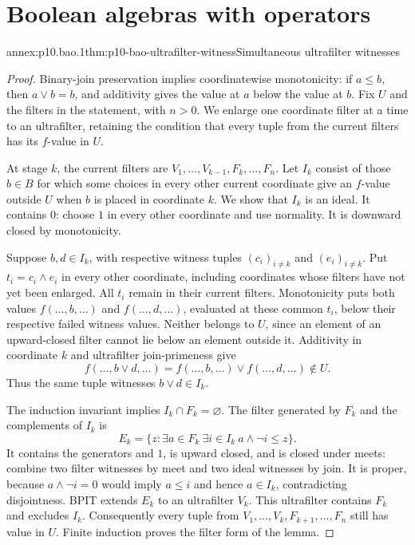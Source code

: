 
\section{Boolean algebras with operators}

\begin{annexitem}{annex:p10.bao.1}{thm:p10-bao-ultrafilter-witness}{Simultaneous ultrafilter witnesses}
\begin{proof}
Binary-join preservation implies coordinatewise monotonicity:
if \(a\leq b\), then \(a\vee b=b\), and additivity gives
the value at \(a\) below the value at \(b\).
Fix \(U\) and the filters in the statement, with \(n>0\).
We enlarge one coordinate filter at a time to an ultrafilter,
retaining the condition that every tuple from the current filters
has its \(f\)-value in \(U\).

At stage \(k\), the current filters are
\(V_1,\ldots,V_{k-1},F_k,\ldots,F_n\).
Let \(I_k\) consist of those \(b\in B\) for which some choices
in every other current coordinate give an \(f\)-value outside \(U\)
when \(b\) is placed in coordinate \(k\).
We show that \(I_k\) is an ideal.
It contains \(0\): choose \(1\) in every other coordinate and use
normality. It is downward closed by monotonicity.

Suppose \(b,d\in I_k\), with respective witness tuples
\((c_i)_{i\ne k}\) and \((e_i)_{i\ne k}\).
Put \(t_i=c_i\wedge e_i\) in every other coordinate, including
coordinates whose filters have not yet been enlarged.
All \(t_i\) remain in their current filters.
Monotonicity puts both values \(f(\ldots,b,\ldots)\) and
\(f(\ldots,d,\ldots)\), evaluated at these common \(t_i\),
below their respective failed witness values.
Neither belongs to \(U\), since an element of an upward-closed
filter cannot lie below an element outside it.
Additivity in coordinate \(k\) and ultrafilter join-primeness give
\[
 f(\ldots,b\vee d,\ldots)
   =f(\ldots,b,\ldots)\vee f(\ldots,d,\ldots)\notin U.
\]
Thus the same tuple witnesses \(b\vee d\in I_k\).

The induction invariant implies \(I_k\cap F_k=\varnothing\).
The filter generated by \(F_k\) and the complements of \(I_k\) is
\[
 E_k=\{z:\exists a\in F_k\ \exists i\in I_k\
                                a\wedge\neg i\leq z\}.
\]
It contains the generators and \(1\), is upward closed, and is
closed under meets: combine two filter witnesses by meet and two
ideal witnesses by join.
It is proper, because \(a\wedge\neg i=0\) would imply \(a\leq i\)
and hence \(a\in I_k\), contradicting disjointness.
BPIT extends \(E_k\) to an ultrafilter \(V_k\).
This ultrafilter contains \(F_k\) and excludes \(I_k\).
Consequently every tuple from
\(V_1,\ldots,V_k,F_{k+1},\ldots,F_n\) still has value in \(U\).
Finite induction proves the filter form of the lemma.


\end{proof}
\end{annexitem}
